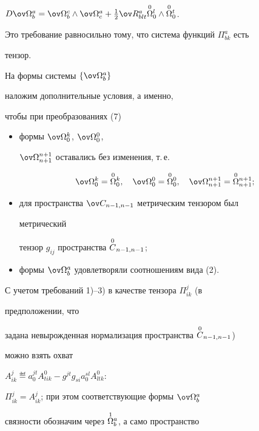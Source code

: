 $D\ov\Omega{}^a_b=\ov\Omega{}^c_b\wedge\ov\Omega{}^a_c+ \frac{1}{2}\ov 


R^a_{blt}\up{0}{\Omega}^l_0\wedge\up{0}{\Omega}^t_0$. 


Это требование равносильно тому, что система функций $\Pi^a_{bk}$ есть 


тензор. 


 


На формы системы $\{\ov\Omega{}^a_b\}$ 


наложим дополнительные условия, а именно, 


чтобы при преобразованиях (7) 


\begin{itemize} 


\item[1)] формы $\ov\Omega{}^k_0$, $\ov\Omega{}^0_0$, 


$\ov\Omega^{n+1}_{n+1}$ оставались без изменения, т.\,е. 


$$ 


\ov\Omega{}^k_0=\up{0}{\Omega}^k_0,\quad 


\ov\Omega{}^0_0=\up{0}{\Omega}^0_0,\quad 


\ov\Omega{}^{n+1}_{n+1}=\up{0}{\Omega}^{n+1}_{n+1}; 


$$ 


\item[2)] для пространства $\ov C_{n-1,n-1}$ метрическим тензором был 


метрический 


тензор $g_{ij}$ пространства $\overset{0}{C}{}_{n-1,n-1}$; 


\item[3)] формы $\ov\Omega{}^a_b$ удовлетворяли соотношениям вида (2). 


\end{itemize} 


 


С учетом требований 1)--3) в качестве тензора $\Pi^j_{ik}$ (в 


предположении, что 


задана невырожденная нормализация пространства $\overset{0}{C}{}_{n-1,n-1}$) 


можно взять охват 


$A^j_{ik}\eqdef a^{jt}_0A^0_{tik}-g^{jt}g_{si}a^{sl}_0A^0_{ltk}$: 


$\Pi^j_{ik}=A^j_{ik}$; при этом соответствующие формы $\ov\Omega{}^a_b$ 


связности обозначим через $\overset{1}{\Omega}{}^a_b$, а само пространство 



